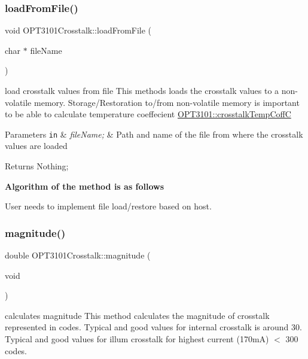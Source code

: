 \subsubsection{\texorpdfstring{load\+From\+File()}{loadFromFile()}}
{\footnotesize\ttfamily void O\+P\+T3101\+Crosstalk\+::load\+From\+File (\begin{DoxyParamCaption}\item[{char $\ast$}]{file\+Name }\end{DoxyParamCaption})}



load crosstalk values from file This methods loads the crosstalk values to a non-\/volatile memory. Storage/\+Restoration to/from non-\/volatile memory is important to be able to calculate temperature coeffecient \mbox{\hyperlink{class_o_p_t3101_1_1crosstalk_temp_coff_c}{O\+P\+T3101\+::crosstalk\+Temp\+CoffC}} 


\begin{DoxyParams}[1]{Parameters}
\mbox{\tt in}  & {\em file\+Name;} & Path and name of the file from where the crosstalk values are loaded \\
\hline
\end{DoxyParams}
\begin{DoxyReturn}{Returns}
Nothing; 
\end{DoxyReturn}
{\bfseries Algorithm of the method is as follows}
\begin{DoxyItemize}
\item User needs to implement file load/restore based on host. 
\end{DoxyItemize}\mbox{\label{class_o_p_t3101_crosstalk_acb6217116c652bc7c0c84e7b86504f18}} 
\subsubsection{\texorpdfstring{magnitude()}{magnitude()}}
{\footnotesize\ttfamily double O\+P\+T3101\+Crosstalk\+::magnitude (\begin{DoxyParamCaption}\item[{void}]{ }\end{DoxyParamCaption})}



calculates magnitude This method calculates the magnitude of crosstalk represented in codes. Typical and good values for internal crosstalk is around 30. Typical and good values for illum crosstalk for highest current (170mA) $<$ 300 codes. 


